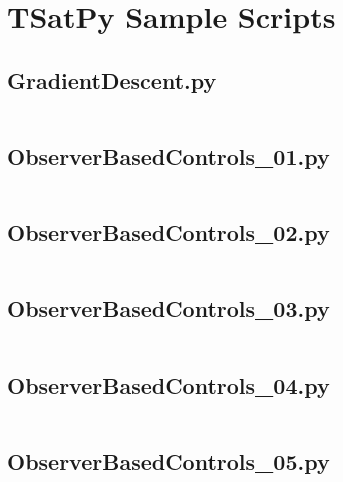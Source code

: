 
\chapter{TSatPy Sample Scripts}
\label{chap:tsatpy_samples}

\linespread{1}

\pagebreak
\section*{GradientDescent.py}\label{code:TSatPySamples/GradientDescent.py}\inputminted[linenos,fontsize=\scriptsize]{python}{/home/dcouture/git/mathyourlife/TSatPy/tex/sample_scripts/GradientDescent.py}

\pagebreak
\section*{ObserverBasedControls\_01.py}\label{code:TSatPySamples/ObserverBasedControls_01.py}\inputminted[linenos,fontsize=\scriptsize]{python}{/home/dcouture/git/mathyourlife/TSatPy/tex/sample_scripts/ObserverBasedControls_01.py}

\pagebreak
\section*{ObserverBasedControls\_02.py}\label{code:TSatPySamples/ObserverBasedControls_02.py}\inputminted[linenos,fontsize=\scriptsize]{python}{/home/dcouture/git/mathyourlife/TSatPy/tex/sample_scripts/ObserverBasedControls_02.py}

\pagebreak
\section*{ObserverBasedControls\_03.py}\label{code:TSatPySamples/ObserverBasedControls_03.py}\inputminted[linenos,fontsize=\scriptsize]{python}{/home/dcouture/git/mathyourlife/TSatPy/tex/sample_scripts/ObserverBasedControls_03.py}

\pagebreak
\section*{ObserverBasedControls\_04.py}\label{code:TSatPySamples/ObserverBasedControls_04.py}\inputminted[linenos,fontsize=\scriptsize]{python}{/home/dcouture/git/mathyourlife/TSatPy/tex/sample_scripts/ObserverBasedControls_04.py}

\pagebreak
\section*{ObserverBasedControls\_05.py}\label{code:TSatPySamples/ObserverBasedControls_05.py}\inputminted[linenos,fontsize=\scriptsize]{python}{/home/dcouture/git/mathyourlife/TSatPy/tex/sample_scripts/ObserverBasedControls_05.py}

